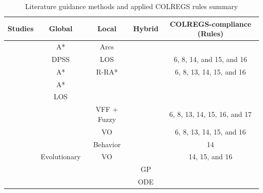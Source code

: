     \begin{table}[H]
    \caption{Literature guidance methods and applied COLREGS rules summary}
    \label{tab:RelatedWork_Summary}
    \begin{tabular}{l|c|c|c|c}
    \hline
    \multicolumn{1}{c}{Studies}            & Global & Local & Hybrid & \multicolumn{1}{c}{COLREGS-compliance (Rules)}   \\ \hline
    \hline
    \cite{Larson2006Autonomous}                     & A*              & Arcs           &                 &                                                          \\
    \cite{Naeem2012COLREGS}                         & DPSS            & LOS            &                 & 6, 8,  14, and 15, and 16                                \\
    \cite{Campbell2013Automatic}                    & A*              & R-RA*          &                 & 6, 8, 13, 14, 15, and 16                                 \\
    \cite{Naus2013Idea}                             & A*              &                &                 &                                                          \\
    \cite{Annamalai2013Comparison}                  & LOS             &                &                 &                                                          \\
    \cite{Lee2004Fuzzy}                             &                 & VFF + Fuzzy    &                 & 6, 8, 13, 14, 15, 16, and 17                             \\
    \cite{Kuwata2014Safe}                           &                 & VO             &                 & 6, 8, 13, 14, 15, and 16                                 \\
    \cite{Benjamin2006Method}                       &                 & Behavior       &                 & 14                                                       \\
    \cite{Zhuang2011Motion}                         & Evolutionary    & VO             &                 & 14, 15, and 16                                           \\
    \cite{Svec2011aAutomated, Svec2012Automated}    &                 &                & GP              &                                                          \\
    \cite{Soltan2009Trajectory}                     &                 &                & ODE             &                                                          \\ \hline
    \end{tabular}
    \end{table}
    
